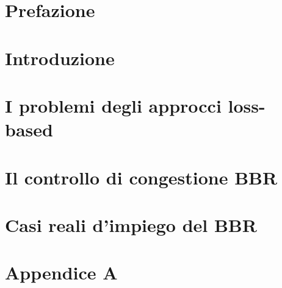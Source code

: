\documentclass[a4paper,12pt]{report}
\begin{document}
	
	
	
	\tableofcontents %
	
	\chapter{Prefazione}	
				
		
	\chapter{Introduzione}
				
		
	\chapter{I problemi degli approcci loss-based}
		
		
	\chapter{Il controllo di congestione BBR}		
		

	\chapter{Casi reali d'impiego del BBR}
		
	
	
	\chapter{Appendice A}
		
	
	\printbibliography

\end{document}
